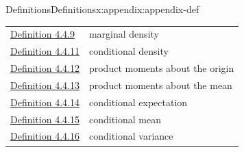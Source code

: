 \documentclass[oneside,10pt,]{book}
\begin{document}
\begin{appendixptx}{Definitions}{}{Definitions}{}{}{x:appendix:appendix-def}
\begin{longtable}[l]{ll}
\hyperref[x:definition:def-marginal-density-3-10-cont]{Definition 4.4.9}& marginal density\\
\hyperref[x:definition:def-conditional-density-3-10-cont]{Definition 4.4.11}& conditional density\\
\hyperref[x:definition:def-product-moments-origin-4-7-cont]{Definition 4.4.12}& product moments about the origin\\
\hyperref[x:definition:def-product-moments-mean-4-8-cont]{Definition 4.4.13}& product moments about the mean\\
\hyperref[x:definition:def-conditional-expectation-4-10]{Definition 4.4.14}& conditional expectation\\
\hyperref[x:definition:def-conditional-mean]{Definition 4.4.15}& conditional mean\\
\hyperref[x:definition:def-conditional-variance]{Definition 4.4.16}& conditional variance\\
\end{longtable}
\end{appendixptx}
%
%
\typeout{************************************************}
\typeout{************************************************}
%
\end{document}
